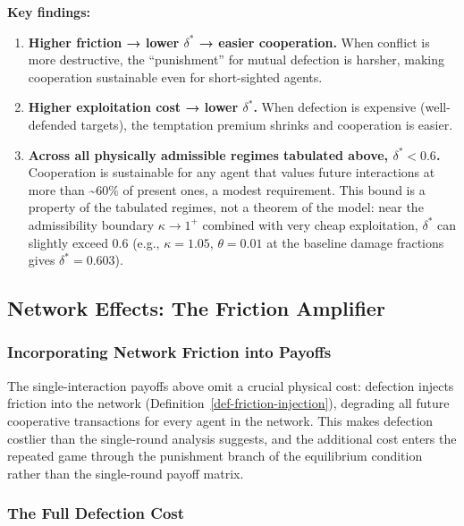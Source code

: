 \documentclass[11pt]{article}
\theoremstyle{plain}
\theoremstyle{definition}
\theoremstyle{remark}
\let\origsubsection\subsection
\renewcommand{\subsection}{\needspace{7\baselineskip}\origsubsection}
\let\origsubsubsection\subsubsection
\renewcommand{\subsubsection}{\needspace{4\baselineskip}\origsubsubsection}
\providecommand{\tightlist}{%
  \setlength{\itemsep}{0pt}\setlength{\parskip}{0pt}}
\begin{document}
\textbf{Key findings:}

\begin{enumerate}
\def\labelenumi{\arabic{enumi}.}
\tightlist
\item
  \textbf{Higher friction → lower \(\delta^*\) → easier cooperation.}
  When conflict is more destructive, the ``punishment'' for mutual
  defection is harsher, making cooperation sustainable even for
  short-sighted agents.
\item
  \textbf{Higher exploitation cost → lower \(\delta^*\).} When defection
  is expensive (well-defended targets), the temptation premium shrinks
  and cooperation is easier.
\item
  \textbf{Across all physically admissible regimes tabulated above,
  \(\delta^* < 0.6\).} Cooperation is sustainable for any agent that
  values future interactions at more than \textasciitilde60\% of present
  ones, a modest requirement. This bound is a property of the tabulated
  regimes, not a theorem of the model: near the admissibility boundary
  \(\kappa \to 1^+\) combined with very cheap exploitation, \(\delta^*\)
  can slightly exceed \(0.6\) (e.g., \(\kappa = 1.05\),
  \(\theta = 0.01\) at the baseline damage fractions gives
  \(\delta^* = 0.603\)).
\end{enumerate}

\subsection{Network Effects: The Friction
Amplifier}\label{network-effects-the-friction-amplifier}

\subsubsection{Incorporating Network Friction into
Payoffs}\label{incorporating-network-friction-into-payoffs}

The single-interaction payoffs above omit a crucial physical cost:
defection injects friction into the network
(Definition~\ref{def-friction-injection}), degrading all future
cooperative transactions for every agent in the network. This makes
defection costlier than the single-round analysis suggests, and the
additional cost enters the repeated game through the punishment branch
of the equilibrium condition rather than the single-round payoff matrix.

\subsubsection{The Full Defection Cost}\label{the-full-defection-cost}
\end{document}
